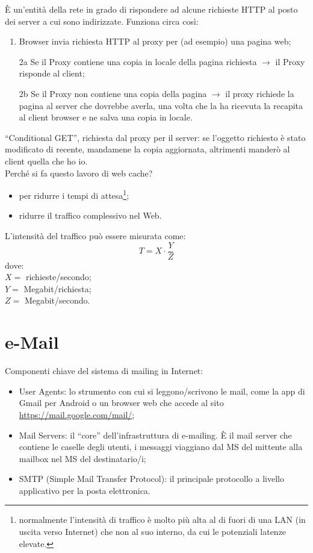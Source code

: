 \noindent È un'entità della rete in grado di rispondere ad alcune richieste HTTP al posto dei server a cui sono indirizzate. Funziona circa così:
\begin{enumerate}
    \item Browser invia richiesta HTTP al proxy per (ad esempio) una pagina web;
    \item [2a] Se il Proxy contiene una copia in locale della pagina richiesta $\rightarrow$ il Proxy risponde al client;
    \item [2b] Se il Proxy non contiene una copia della pagina $\rightarrow$ il proxy richiede la pagina al server che dovrebbe averla, una volta che la ha ricevuta la recapita al client browser e ne salva una copia in locale. 
\end{enumerate}

\noindent ``Conditional GET'', richiesta dal proxy per il server: se l'oggetto richiesto è stato modificato di recente, mandamene la copia aggiornata, altrimenti manderò al client quella che ho io.\\

\noindent Perché si fa questo lavoro di web cache?
\begin{itemize}
    \item per ridurre i tempi di attesa\footnote{normalmente l'intensità di traffico è molto più alta al di fuori di una LAN (in uscita verso Internet) che non al suo interno, da cui le potenziali latenze elevate.};
    \item ridurre il traffico complessivo nel Web.
\end{itemize}
\noindent L'intensità del traffico può essere misurata come: 
\[T = X \cdot \dfrac{Y}{Z}\]
dove:\\
$X=$ richieste/secondo;\\
$Y=$ Megabit/richiesta;\\
$Z=$ Megabit/secondo.\\



\section*{\textcolor{Periwinkle}{e-Mail}}
\noindent Componenti chiave del sistema di mailing in Internet:
\begin{itemize}
    \item User Agents: lo strumento con cui si leggono/scrivono le mail, come la app di Gmail per Android o un browser web che accede al sito \hyperlink{mail.google.com}{https://mail.google.com/mail/};
    \item Mail Servers: il ``core'' dell'infrastruttura di e-mailing. È il mail server che contiene le caselle degli utenti, i messaggi viaggiano dal MS del mittente alla mailbox nel MS del destinatario/i;
    \item SMTP (Simple Mail Transfer Protocol): il principale protocollo a livello applicativo per la posta elettronica.
\end{itemize}

